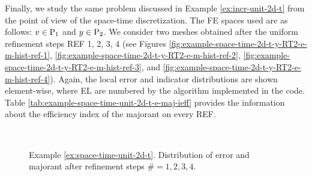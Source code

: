 \begin{example}
\label{ex:space-time-unit-2d-t}

Finally, we study the same problem discussed in Example \ref{ex:incr-unit-2d-t} from the
point of view of the space-time discretization. The FE spaces used are as follows: 
$v \in {\rm P}_{1}$ and $y \in {\rm P}_{2}$. We consider two meshes obtained after the uniform
refinement steps REF 1, 2, 3, 4 (see  
Figures \ref{fig:example-space-time-2d-t-y-RT2-e-m-hist-ref-1}, 
\ref{fig:example-space-time-2d-t-y-RT2-e-m-hist-ref-2},
\ref{fig:example-space-time-2d-t-y-RT2-e-m-hist-ref-3}, and 
\ref{fig:example-space-time-2d-t-y-RT2-e-m-hist-ref-4}). Again, the local error and 
indicator distributions are shown element-wise, where EL are numbered by the 
algorithm implemented in the code. 
Table \ref{tab:example-space-time-unit-2d-t-e-maj-ieff} provides the information about
the efficiency index of the majorant on every REF.

\begin{figure}[!ht]
	\centering
	\\
	\caption{Example \ref{ex:space-time-unit-2d-t}. 
	Distribution of error and majorant after refinement steps $\# = 1, 2, 3, 4$.}
\end{figure}



\end{example}
